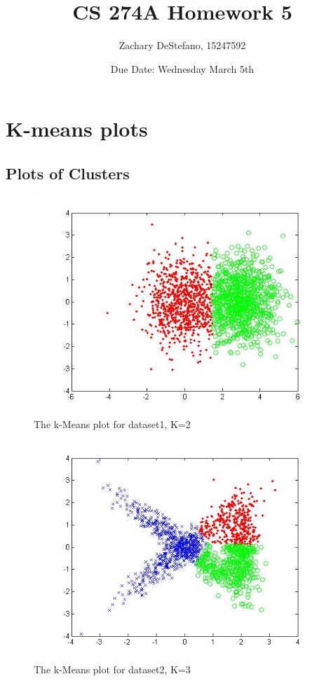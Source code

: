 \documentclass[11pt,psfig]{article}
\begin{document}
\setlength{\parskip}{1.2ex plus0.3ex minus 0.3ex}


\thispagestyle{empty} \pagestyle{myheadings} 



\title{CS 274A Homework 5}
\author{Zachary DeStefano, 15247592}
\date{Due Date: Wednesday March 5th}

\maketitle

 \newpage

\section*{K-means plots}

\subsection*{Plots of Clusters}

\begin{figure}[H]
\centering
\includegraphics[height=3.25in]{dataset1_kMeansPlot.jpg}
\caption{The k-Means plot for dataset1, K=2}
\end{figure}

\begin{figure}[H]
\centering
\includegraphics[height=3.25in]{dataset2_kMeansPlot.jpg}
\caption{The k-Means plot for dataset2, K=3}
\end{figure}
\end{document}
